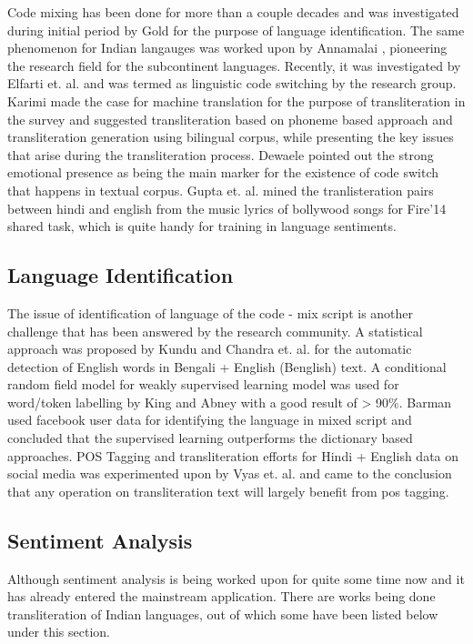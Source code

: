 \documentclass[12pt]{book}
\begin{document}
Code mixing has been done for more than a couple decades and was investigated
during initial period by Gold \cite{gold_language_1967} for the purpose of
language identification. The same phenomenon for Indian langauges was worked
upon by Annamalai \cite{annamalai_anglicized_1978}, pioneering the research
field for the subcontinent languages. Recently, it was investigated by Elfarti
et. al. \cite{elfardy_token_2012} and was termed as linguistic code switching
by the research group. Karimi \cite{karimi_machine_2011} made the case for
machine translation for the purpose of transliteration in the survey and
suggested transliteration based on phoneme based approach and transliteration
generation using bilingual corpus, while presenting the key issues that arise
during the transliteration process. Dewaele \cite{dewaele_emotions_2010}
pointed out the strong emotional presence as being the main marker for the
existence of code switch that happens in textual corpus. Gupta et. al.
\cite{gupta_mining_2012} mined the tranlisteration pairs between hindi and
english from the music lyrics of bollywood songs for Fire'14 shared task, which
is quite handy for training in language sentiments. 

\subsection{Language Identification}
The issue of identification of language of the code - mix script is another
challenge that has been answered by the research community. A statistical
approach was proposed by Kundu and Chandra et. al. \cite{kundu_automatic_2012}
for the automatic detection of English words in Bengali + English (Benglish)
text. A conditional random field model for weakly supervised learning model was
used for word/token labelling by King and Abney \cite{king_labeling_2013} with
a good result of > 90\%. Barman \cite{barman_code_2014} used facebook user data
for identifying the language in mixed script and concluded that the supervised
learning outperforms the dictionary based approaches. POS Tagging and
transliteration efforts for Hindi + English data on social media was
experimented upon by Vyas et. al. \cite{vyas_pos_2014} and came to the
conclusion that any operation on transliteration text will largely benefit from
pos tagging. 

\subsection{Sentiment Analysis}
Although sentiment analysis is being worked upon for quite some time now and it
has already entered the mainstream application. There are works being done
transliteration of Indian languages, out of which some have been listed below
under this section.\\
\end{document}
